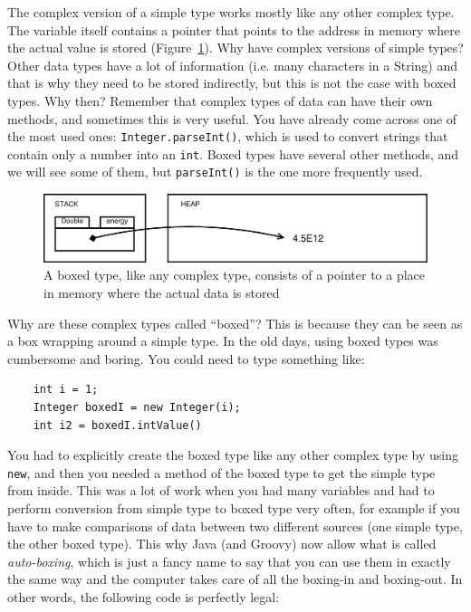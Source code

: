 The complex version of a simple type works mostly like any other
complex type. The variable itself contains a pointer that points to
the address in memory where the actual value is stored
(Figure~\ref{fig:doubled}). Why have 
complex versions of simple types? Other data types have a lot of
information (i.e. many characters in a String) and that is why they
need to be stored indirectly, but this is not the case with boxed
types. Why then? Remember that complex types of data
can have their own methods, and sometimes this is very useful. You
have already come across one of the most used ones: 
\verb+Integer.parseInt()+,
which is used to convert strings that contain only a number into an
\verb+int+. Boxed types have several other methods, and we will see
some of them, but \verb+parseInt()+ is the one more frequently used. 

\begin{figure}[htbp]
  \centering
  \includegraphics[width=\textwidth]{gfx/variables-double}
  \caption{A boxed type, like any complex type, consists of a pointer
    to a place in memory where the actual data is stored}
  \label{fig:doubled}
\end{figure}

Why are these complex types called ``boxed''? This is because they can
be seen as a box wrapping around a simple type. In the old days, using
boxed types was cumbersome and boring. You could need to type
something like:

\begin{verbatim}
    int i = 1;
    Integer boxedI = new Integer(i);
    int i2 = boxedI.intValue()
\end{verbatim}

You had to explicitly create the boxed type like any other complex
type by using \verb+new+, and then you needed a method of the boxed
type to get the simple type from inside. This was a lot of work when
you had many variables and had to perform conversion from
simple type to boxed type very often, for example if you have to make
comparisons of data between two different sources (one simple type,
the other boxed type). This why Java (and Groovy) now
allow what is called \emph{auto-boxing}, which is just a fancy name to
say that you can use them in exactly the same way and the computer
takes care of all the boxing-in and boxing-out. In other words, the
following code is perfectly legal: 

